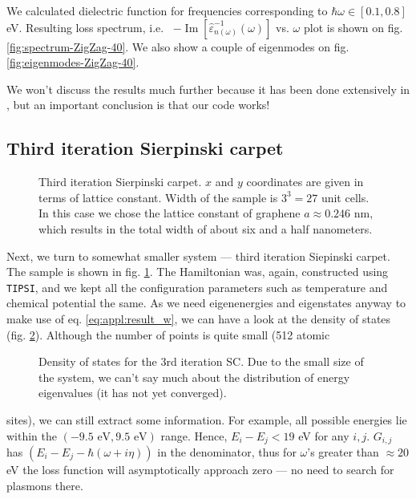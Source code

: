 \documentclass[a4paper,12pt]{article}
\begin{document}
    We calculated dielectric function for frequencies corresponding to $\hbar\omega \in [0.1,0.8]$ eV. Resulting loss spectrum, i.e. \ $-\operatorname{Im}[\hat\varepsilon^{-1}_{n(\omega)}(\omega)]$ vs. $\omega$ plot is shown on fig. \ref{fig:spectrum-ZigZag-40}. We also show a couple of eigenmodes on fig. \ref{fig:eigenmodes-ZigZag-40}.

    We won't discuss the results much further because it has been done extensively in \cite{plasmonic2015}, but an important conclusion is that our code works!


\subsection{Third iteration Sierpinski carpet}
    \begin{figure}[h]
    \vspace{-0.5cm}
    
    \caption{Third iteration Sierpinski carpet. $x$ and $y$ coordinates are given in terms of lattice constant. Width of the sample is $3^3 = 27$ unit cells. In this case we chose the lattice constant of graphene $a \approx 0.246$ nm, which results in the total width of about six and a half nanometers.}
    \label{fig:coordinates-3rd-SC}
    \end{figure}
    Next, we turn to somewhat smaller system --- third iteration Siepinski carpet. The sample is shown in fig. \ref{fig:coordinates-3rd-SC}. The Hamiltonian was, again, constructed using \texttt{TIPSI}, and we kept all the configuration parameters such as temperature and chemical potential the same. As we need eigenenergies and eigenstates anyway to make use of eq. \eqref{eq:appl:result_w}, we can have a look at the density of states (fig. \ref{fig:dos-3rd-SC}). Although the number of points is quite small (512 atomic
    \begin{figure}
    \center
    \vspace{-0.9cm}
    
    \caption{Density of states for the 3rd iteration SC. Due to the small size of the system, we can't say much about the distribution of energy eigenvalues (it has not yet converged).}
    \label{fig:dos-3rd-SC}
    \end{figure}
    sites), we can still extract some information. For example, all possible energies lie within the $(-9.5\text{ eV}, 9.5\text{ eV})$ range. Hence, $E_i - E_j < 19$ eV for any $i, j$. $G_{i,j}$ has $(E_i - E_j - \hbar(\omega + i\eta))$ in the denominator, thus for $\omega$'s greater than $\approx20$ eV the loss function will asymptotically approach zero --- no need to search for plasmons there.
\end{document}
